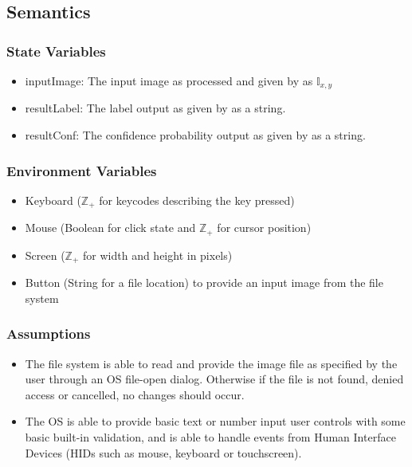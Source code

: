 \documentclass[12pt, titlepage]{article}
\begin{document}
\subsection{Semantics}

\subsubsection{State Variables}

\begin{itemize}
  \item inputImage: The input image as processed and given by  as $\mathbb{I}_{x, y}$
  \item resultLabel: The label output as given by  as a string.
  \item resultConf: The confidence probability output as given by  as a string.
\end{itemize}

\subsubsection{Environment Variables}

\begin{itemize}
  \item Keyboard ($\mathbb{Z}_{+}$ for keycodes describing the key pressed)
  \item Mouse (Boolean for click state and  $\mathbb{Z}_{+}$ for cursor position)
  \item Screen ($\mathbb{Z}_{+}$ for width and height in pixels)
  \item Button (String for a file location) to provide an input image  from the file system
\end{itemize}

\subsubsection{Assumptions}

\begin{itemize}
  \item The file system is able to read and provide the image file as specified by the user through an OS file-open dialog.
  Otherwise if the file is not found, denied access or cancelled, no changes should occur.
  \item The OS is able to provide basic text or number input user controls with some basic built-in validation, and
  is able to handle events from Human Interface Devices (HIDs such as mouse, keyboard or touchscreen).
\end{itemize}
\end{document}
